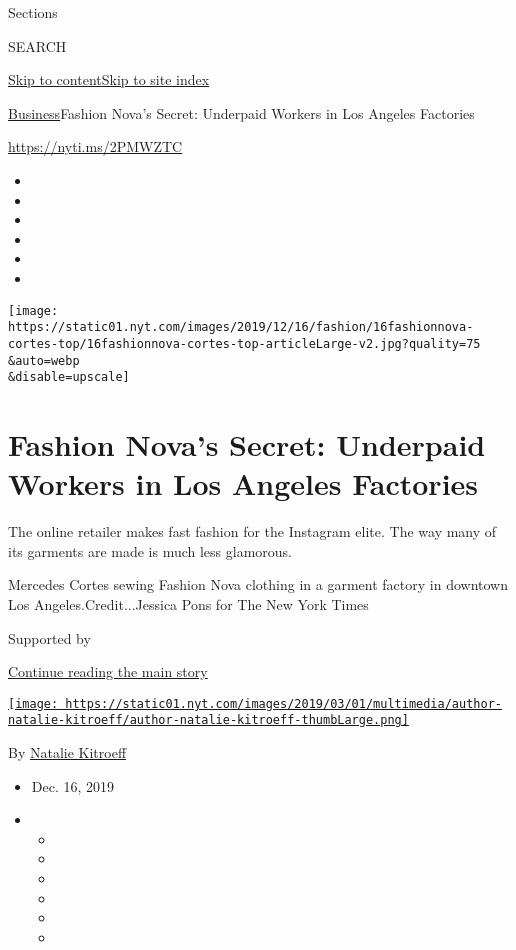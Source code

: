 Sections

SEARCH

\protect\hyperlink{site-content}{Skip to
content}\protect\hyperlink{site-index}{Skip to site index}

\href{/section/business}{Business}\textbar{}Fashion Nova's Secret:
Underpaid Workers in Los Angeles Factories

\url{https://nyti.ms/2PMWZTC}

\begin{itemize}
\item
\item
\item
\item
\item
\item
\end{itemize}

\texttt{[image: https://static01.nyt.com/images/2019/12/16/fashion/16fashionnova-cortes-top/16fashionnova-cortes-top-articleLarge-v2.jpg?quality=75\\\&auto=webp\\\&disable=upscale]}

\hypertarget{fashion-novas-secret-underpaid-workers-in-los-angeles-factories}{%
\section{Fashion Nova's Secret: Underpaid Workers in Los Angeles
Factories}\label{fashion-novas-secret-underpaid-workers-in-los-angeles-factories}}

The online retailer makes fast fashion for the Instagram elite. The way
many of its garments are made is much less glamorous.

Mercedes Cortes sewing Fashion Nova clothing in a garment factory in
downtown Los Angeles.Credit...Jessica Pons for The New York Times

Supported by

\protect\hyperlink{after-sponsor}{Continue reading the main story}

\href{https://www.nytimes.com/by/natalie-kitroeff}{\texttt{[image: https://static01.nyt.com/images/2019/03/01/multimedia/author-natalie-kitroeff/author-natalie-kitroeff-thumbLarge.png]}}

By \href{https://www.nytimes.com/by/natalie-kitroeff}{Natalie Kitroeff}

\begin{itemize}
\item
  Dec. 16, 2019
\item
  \begin{itemize}
  \item
  \item
  \item
  \item
  \item
  \item
  \end{itemize}
\end{itemize}

